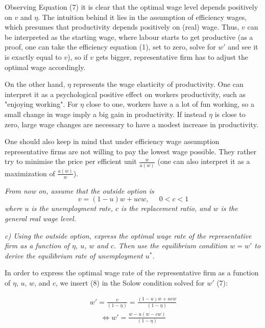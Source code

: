 \documentclass[11pt]{article} %
\begin{document}
\bigskip
Observing Equation (7) it is clear that the optimal wage level depends positively on $v$ and $\eta$. The intuition behind it lies in the assumption of efficiency wages, which presumes that productivity depends positively on (real) wage. Thus, $v$ can be interpreted as the starting wage, where labour starts to get productive (as a proof, one can take the efficiency equation (1), set to zero, solve for $w'$ and see it is exactly equal to $v$), so if $v$ gets bigger, representative firm has to adjust the optimal wage accordingly.\par

On the other hand, $\eta$ represents the wage elasticity of productivity. One can interpret it as a psychological positive effect on workers productivity, such as "enjoying working". For $\eta$ close to one, workers have a a lot of fun working, so a small change in wage imply a big gain in productivity. If instead $\eta$ is close to zero, large wage changes are necessary to have a modest increase in productivity. \par

One should also keep in mind that under efficiency wage assumption representative firms are not willing to pay the lowest wage possible. They rather try to minimise the price per efficient unit $\frac{w} {a(w)}$ (one can also interpret it as a maximization of $\frac{a(w)} {w}$).





\pagebreak
\textit{From now on, assume that the outside option is}
\begin{equation}
    v = (1-u)w+ucw, \;\;\;\;\; 0<c<1
\end{equation}
\textit{where $u$ is the unemployment rate, $c$ is the replacement ratio, and $w$ is the general real wage level.}



\bigskip
\textit{c) Using the outside option, express the optimal wage rate of the representative firm as a function of $\eta$, $u$, $w$ and $c$. Then use the equilibrium
condition $w=w'$ to derive the equilibrium rate of unemployment $u^*$.} \par
\bigskip
In order to express  the  optimal  wage  rate  of  the  representative  firm  as
a  function  of $\eta$, $u$, $w$, and $c$, we insert (8) in the Solow condition solved for $w'$ (7):

\begin{align*}
    w' = \frac{v} {(1 - \eta)} = \frac{(1-u)w+ucw} {(1 - \eta)}
\end{align*}
\begin{align*}
   \Longleftrightarrow w' = \frac{w - u\left(w - cw\right)} {(1 - \eta)}
\end{align*}
\end{document}
